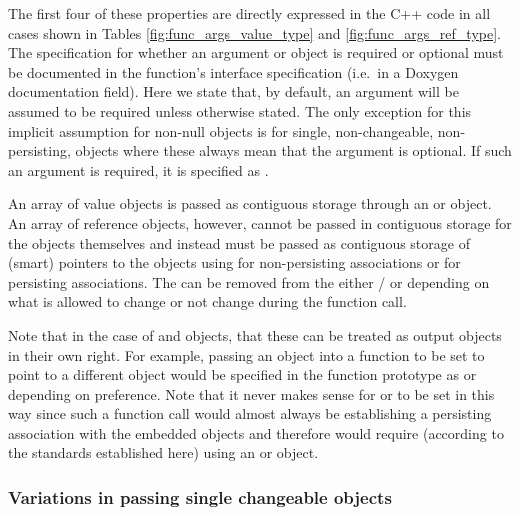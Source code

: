 \documentclass[pdf,ps2pdf,11pt]{SANDreport}
\begin{document}
The first four of these properties are directly expressed in the C++
code in all cases shown in Tables {}\ref{fig:func_args_value_type} and
{}\ref{fig:func_args_ref_type}.  The specification for whether an
argument or object is required or optional must be documented in the
function's interface specification (i.e.\ in a Doxygen documentation
{} field).  Here we state that, by default, an argument
will be assumed to be required unless otherwise stated.  The only
exception for this implicit assumption for non-null objects is
{} for single, non-changeable,
non-persisting, objects where these always mean that the argument is
optional.  If such an argument is required, it is specified as
{}.

An array of value objects is passed as contiguous storage through an
{} or {} object.  An
array of reference objects, however, cannot be passed in contiguous
storage for the objects themselves and instead must be passed as
contiguous storage of (smart) pointers to the objects using
{} for non-persisting
associations or {} for
persisting associations.  The {} can be removed from the
either {}/{} or {} depending on what
is allowed to change or not change during the function call.

Note that in the case of {} and {}
objects, that these can be treated as output objects in their own
right.  For example, passing an {} object into a
function to be set to point to a different {} object would
be specified in the function prototype as {} or {} depending on preference.  Note that it
never makes sense for {} or {} to be set
in this way since such a function call would almost always be
establishing a persisting association with the embedded objects and
therefore would require (according to the standards established here)
using an {} or {} object.


%
\subsubsection*{Variations in passing single changeable objects}
%
\end{document}
